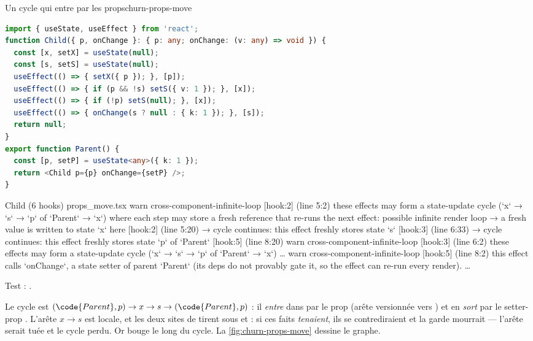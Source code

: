 \begin{exemple}{Un cycle qui entre par les props}{churn-props-move}
\begin{lstlisting}[language=TypeScript,caption={\file{/tmp/ch15/props_move.tsx}},label={lst:churn-props-move}]
import { useState, useEffect } from 'react';
function Child({ p, onChange }: { p: any; onChange: (v: any) => void }) {
  const [x, setX] = useState(null);
  const [s, setS] = useState(null);
  useEffect(() => { setX({ p }); }, [p]);
  useEffect(() => { if (p && !s) setS({ v: 1 }); }, [x]);
  useEffect(() => { if (!p) setS(null); }, [x]);
  useEffect(() => { onChange(s ? null : { k: 1 }); }, [s]);
  return null;
}
export function Parent() {
  const [p, setP] = useState<any>({ k: 1 });
  return <Child p={p} onChange={setP} />;
}
\end{lstlisting}
\begin{sortie}
  Child  (6 hooks)  props_move.tsx
    warn   cross-component-infinite-loop  [hook:2]  (line 5:2)  these effects may form a state-update cycle (`x` → `s` → `p` of `Parent` → `x`) where each step may store a fresh reference that re-runs the next effect: possible infinite render loop
       → a fresh value is written to state `x` here [hook:2] (line 5:20)
       → cycle continues: this effect freshly stores state `s` [hook:3] (line 6:33)
       → cycle continues: this effect freshly stores state `p` of `Parent` [hook:5] (line 8:20)
    warn   cross-component-infinite-loop  [hook:3]  (line 6:2)  these effects may form a state-update cycle (`x` → `s` → `p` of `Parent` → `x`) …
    warn   cross-component-infinite-loop  [hook:5]  (line 8:2)  this effect calls `onChange`, a state setter of parent `Parent` (its deps do not provably gate it, so the effect can re-run every render). …
\end{sortie}
Test : \allowbreak{}.
\end{exemple}

Le cycle est $(\code{Parent}, p) \to x \to s \to (\code{Parent}, p)$ : il \emph{entre} dans
 par le prop  (arête versionnée vers ) et en \emph{sort} par le
setter-prop . L'arête $x \to s$ est locale, et les deux sites de 
tirent sous  et  : si ces faits \emph{tenaient}, ils se contrediraient et
la garde  mourrait --- l'arête serait tuée et le cycle perdu. Or  bouge le
long du cycle. La \cref{fig:churn-props-move} dessine le graphe.

